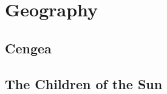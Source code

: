 \documentclass[blue]{GL2020}
\begin{document}



\section*{Geography}
\subsection*{Cengea}


\subsection*{The Children of the Sun}
\end{document}
